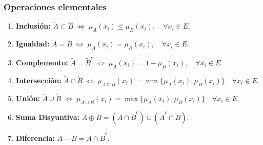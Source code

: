 \documentclass[10pt,a4paper]{article}
\begin{document}
\subsubsection{Operaciones elementales}

\begin{enumerate}
\item \textbf{Inclusión:} $\tilde{A} \subset \tilde{B} \; \iff \; \mu_A(x_i) \leq \mu_B(x_i), \quad \forall x_i \in E$.
\item \textbf{Igualdad:} $\tilde{A} = \tilde{B} \; \iff \; \mu_A(x_i) = \mu_B(x_i), \quad \forall x_i \in E$.
\item \textbf{Complemento:} $\tilde{A} =\tilde{B}^c \; \iff \; \mu_A(x_i) = 1 - \mu_B(x_i), \quad \forall x_i \in E$.
\item \textbf{Intersección:} $\tilde{A} \cap \tilde{B} \; \iff \; \mu_{A\cap B}(x_i) = \min\{\mu_A(x_i),\mu_B(x_i)\} \quad \forall x_i \in E$.
\item \textbf{Unión:} $\tilde{A} \cup \tilde{B} \; \iff \; \mu_{A\cup B}(x_i) = \max\{\mu_A(x_i),\mu_B(x_i)\} \quad \forall x_i \in E$.
\item \textbf{Suma Disyuntiva:} $\tilde{A} \oplus \tilde{B} = (\tilde{A} \cap \tilde{B}^c) \cup (\tilde{A}^c \cap \tilde{B})$.
\item \textbf{Diferencia:} $\tilde{A} - \tilde{B} = \tilde{A} \cap \tilde{B}^c$.
\end{enumerate}
\end{document}
